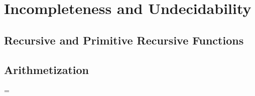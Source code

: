 

\vfill\break

\section{Incompleteness and Undecidability}

\subsection{Recursive and Primitive Recursive Functions}



\subsection{Arithmetization}



\vfill\break

\parskip=\z@
\def\currsubsection{Index}

\index

\bye

